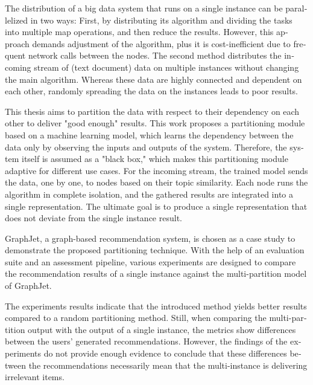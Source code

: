 
\null\vfil
\begin{otherlanguage}{english}
\begin{center}\textsf{\textbf{\abstractname}}\end{center}

\noindent
The distribution of a big data system that runs on a single instance can be parallelized in two ways: First, by distributing its algorithm and dividing the tasks into multiple map operations, and then reduce the results. However, this approach demands adjustment of the algorithm, plus it is cost-inefficient due to frequent network calls between the nodes. The second method distributes the incoming stream of (text document) data on multiple instances without changing the main algorithm. Whereas these data are highly connected and dependent on each other, randomly spreading the data on the instances leads to poor results.

This thesis aims to partition the data with respect to their dependency on each other to deliver "good enough" results. This work proposes a partitioning module based on a machine learning model, which learns the dependency between the data only by observing the inputs and outputs of the system. Therefore, the system itself is assumed as a "black box," which makes this partitioning module adaptive for different use cases. For the incoming stream, the trained model sends the data, one by one, to nodes based on their topic similarity. Each node runs the algorithm in complete isolation, and the gathered results are integrated into a single representation. The ultimate goal is to produce a single representation that does not deviate from the single instance result.

GraphJet, a graph-based recommendation system, is chosen as a case study to demonstrate the proposed partitioning technique. With the help of an evaluation suite and an assessment pipeline, various experiments are designed to compare the recommendation results of a single instance against the multi-partition model of GraphJet.


The experiments results indicate that the introduced method yields better results compared to a random partitioning method. Still, when comparing the multi-partition output with the output of a single instance, the metrics show differences between the users' generated recommendations. However, the findings of the experiments do not provide enough evidence to conclude that these differences between the recommendations necessarily mean that the multi-instance is delivering irrelevant items.


\end{otherlanguage}
\vfil\null
\newpage

